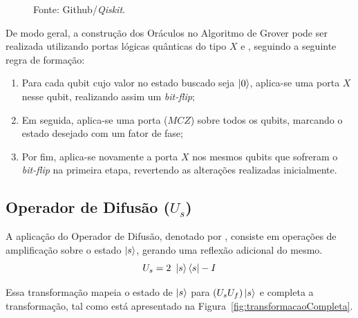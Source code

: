 \begin{figure}[ht!]
    \vspace{0.5em}
    {\small Fonte: Github/\emph{Qiskit}.}
    \label{fig:rotacaoReflexao}
\end{figure}


De modo geral, a construção dos Oráculos no Algoritmo de Grover pode ser realizada utilizando portas lógicas qu\^{a}nticas do tipo $X$ e , seguindo a seguinte regra de formação:

\begin{enumerate}
\label{enum: regraFormacaoOraculo}
    \item Para cada qubit cujo valor no estado buscado seja $\ket{0}$, aplica-se uma porta $X$ nesse qubit, realizando assim um \textit{bit-flip};
    
    \item Em seguida, aplica-se uma porta ($MCZ$) sobre todos os qubits, marcando o estado desejado com um fator de fase;
    
    \item Por fim, aplica-se novamente a porta $X$ nos mesmos qubits que sofreram o \textit{bit-flip} na primeira etapa, revertendo as alterações realizadas inicialmente.
\end{enumerate}

\subsection{Operador de Difus\~{a}o ($U_s$)}
\label{subsec:difusaoAlg}

A  aplicação do Operador de Difusão, denotado por , consiste em operações de amplificação sobre o estado $\ket{s}$, gerando uma reflexão adicional do mesmo.
%
\begin{equation}
    U_s = 2~\ket{s}\bra{s} - I
    \label{eq:Us}
\end{equation}

Essa transformação mapeia o estado de $\ket{s}$ para $(U_sU_f)\ket{s}$ e completa a transformação, tal como está apresentado na Figura~\ref{fig:transformacaoCompleta}.

